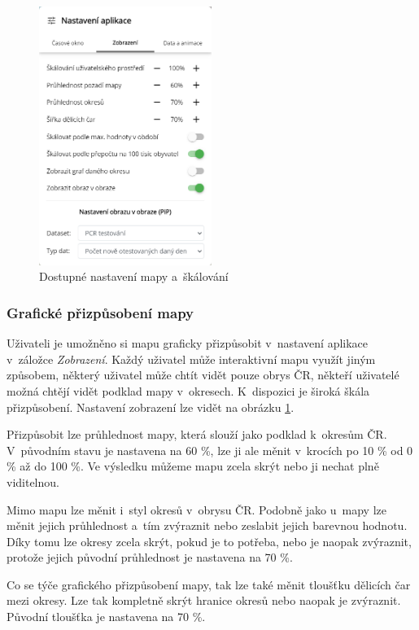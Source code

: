 \begin{figure}[h]
	\centering
	\includegraphics[width=0.5\textwidth]{Pictures/nastaveni.png}
	\caption{Dostupné nastavení mapy a~škálování}
	\label{fig:AppSettings}
\end{figure}

\subsubsection*{Grafické přizpůsobení mapy}

Uživateli je umožněno si mapu graficky přizpůsobit v~nastavení aplikace v~záložce \emph{Zobrazení}. Každý uživatel může interaktivní mapu využít jiným způsobem, některý uživatel může chtít vidět pouze obrys ČR, někteří uživatelé možná chtějí vidět podklad mapy v~okresech. K~dispozici je široká škála přizpůsobení. Nastavení zobrazení lze vidět na obrázku \ref{fig:AppSettings}.

Přizpůsobit lze průhlednost mapy, která slouží jako podklad k~okresům ČR. V~původním stavu je nastavena na 60 \%, lze ji ale měnit v~krocích po 10 \% od 0 \% až do 100 \%. Ve výsledku můžeme mapu zcela skrýt nebo ji nechat plně viditelnou.

Mimo mapu lze měnit i~styl okresů v~obrysu ČR. Podobně jako u~mapy lze měnit jejich průhlednost a~tím zvýraznit nebo zeslabit jejich barevnou hodnotu. Díky tomu lze okresy zcela skrýt, pokud je to potřeba, nebo je naopak zvýraznit, protože jejich původní průhlednost je nastavena na 70 \%.

Co se týče grafického přizpůsobení mapy, tak lze také měnit tloušťku dělicích čar mezi okresy. Lze tak kompletně skrýt hranice okresů nebo naopak je zvýraznit. Původní tloušťka je nastavena na 70 \%.

